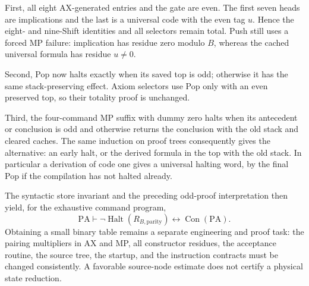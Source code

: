 First, all eight AX-generated entries and the gate are even.  The first
seven heads are implications and the last is a universal code with the even
tag $u$.  Hence the eight- and nine-Shift identities and all selectors remain
total.  Push still uses a forced MP failure: implication has residue zero
modulo $B$, whereas the cached universal formula has residue $u\ne0$.

Second, Pop now halts exactly when its saved top is odd; otherwise it has
the same stack-preserving effect.  Axiom selectors use Pop only with an even
preserved top, so their totality proof is unchanged.

Third, the four-command MP suffix with dummy zero halts when its antecedent
or conclusion is odd and otherwise returns the conclusion with the old
stack and cleared caches.  The same induction on proof trees consequently
gives the alternative: an early halt, or the derived formula in the top with
the old stack.  In particular a derivation of code one gives a universal
halting word, by the final Pop if the compilation has not halted already.

The syntactic store invariant and the preceding odd-proof interpretation
then yield, for the exhaustive command program,
\[
 \mathrm{PA}\vdash\neg\operatorname{Halt}(R_{B,\mathrm{parity}})
                 \longleftrightarrow\operatorname{Con}(\mathrm{PA}).
\]
Obtaining a small binary table remains a separate engineering and proof
task: the pairing multipliers in AX and MP, all constructor residues, the
acceptance routine, the source tree, the startup, and the instruction
contracts must be changed consistently.  A favorable source-node estimate
does not certify a physical state reduction.
